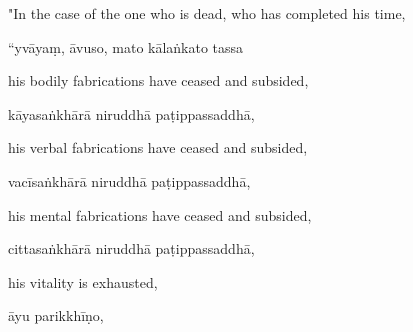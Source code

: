 \begin{samepage}
\begin{leftcolumn*}
"In the case of the one who is dead, who has completed his time,
\end{leftcolumn*}

\begin{rightcolumn}
“yvāyaṃ, āvuso, mato kālaṅkato tassa
\end{rightcolumn}
\end{samepage}

\begin{samepage}
\begin{leftcolumn*}
his bodily fabrications have ceased and subsided,
\end{leftcolumn*}

\begin{rightcolumn}
kāyasaṅkhārā niruddhā paṭippassaddhā,
\end{rightcolumn}
\end{samepage}

\begin{samepage}
\begin{leftcolumn*}
his verbal fabrications have ceased and subsided,
\end{leftcolumn*}

\begin{rightcolumn}
vacīsaṅkhārā niruddhā paṭippassaddhā,
\end{rightcolumn}
\end{samepage}

\begin{samepage}
\begin{leftcolumn*}
his mental fabrications have ceased and subsided,
\end{leftcolumn*}

\begin{rightcolumn}
cittasaṅkhārā niruddhā paṭippassaddhā,
\end{rightcolumn}
\end{samepage}

\begin{samepage}
\begin{leftcolumn*}
his vitality is exhausted,
\end{leftcolumn*}

\begin{rightcolumn}
āyu parikkhīṇo,
\end{rightcolumn}
\end{samepage}

